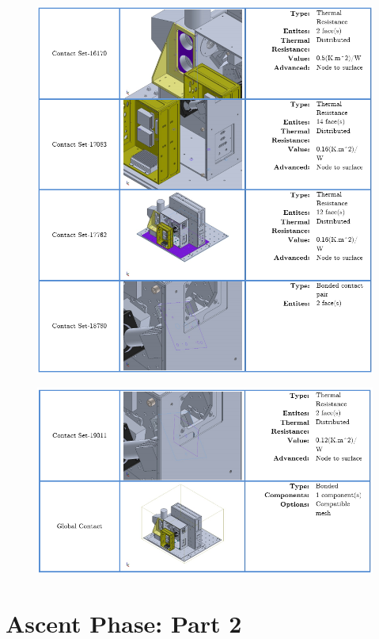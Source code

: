 \begin{figure}
    \centering
    \includegraphics[width=\textwidth]{thermal_load_images/ascent_pt1_TL_images/ascesnt_pt1_15.PNG}
\end{figure}

\begin{figure}
    \centering
    \includegraphics[width=\textwidth]{thermal_load_images/ascent_pt1_TL_images/ascesnt_pt1_16.PNG}
\end{figure}

\clearpage
\section{Ascent Phase: Part 2}

